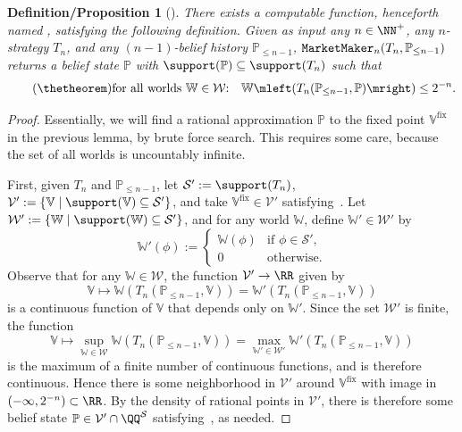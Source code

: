 \documentclass[authordate,onecolumn,noenvironments]{miri-tech-article}
\numberwithin{equation}{subsection}
\newtheorem{defprop}[theorem]{Definition/Proposition}
\newcommand{\nn}{n}
\newcommand{\trade}{T}%
\newcommand{\append}{,}
\newcommand{\adj}{{{\operatorname{fix}}}}
\newcommand{\Valuations}{\mathcal{V}}
\newcommand{\marketmaker}{\text{\upshape{\texttt{MarketMaker}}}\xspace}
\newcommand{\BelState}{\mathbb{P}}
\newcommand{\Valuation}{\mathbb{V}}
\newcommand{\pt}{\BelState}
\newcommand{\World}{\mathbb{W}}
\newcommand{\Worlds}{\mathcal{W}}
\newcommand{\Sentences}{\mathcal{S}}
\begin{document}
\begin{defprop}[\marketmaker]\label{def:markemaker}
  There exists a computable function, henceforth named \marketmaker, satisfying the following definition.  Given as input any $\nn\in\NN^+$, any $\nn$-strategy $\trade_\nn$, and any $(\nn-1)$-belief history $\pt_{\le \nn-1}$, $\marketmaker_\nn(\trade_\nn,\pt_{\le \nn-1})$ returns a belief state $\BelState$ with $\support(\BelState)\subseteq\support(\trade_\nn)$ such that
  \begin{equation}\tag{\thetheorem}\label{eq:marketmaker}
    \text{for all worlds $\World \in \Worlds$:}\quad\World\mleft(\trade_\nn(\pt_{\le \nn-1}\append\BelState)\mright) \le  2^{-n}.
  \end{equation}
\end{defprop}
\begin{proof}
 Essentially, we will find a rational approximation $\BelState$ to the fixed point $\Valuation^\adj$ in the previous lemma, by brute force search.  This requires some care, because the set of all worlds is uncountably infinite.

First, given $\trade_\nn$ and $\pt_{\le \nn-1}$, let $\Sentences':=\support(\trade_\nn)$, $\Valuations' := \{\Valuation \mid \support(\Valuation)\subseteq \Sentences'\}$, and take $\Valuation^\adj\in\Valuations'$ satisfying~.  Let 
$\Worlds' := \{\World \mid \support(\World)\subseteq\Sentences'\}$, and for any world $\World$, define $\World'\in\Worlds'$ by
\[
\World'(\phi) := 
\begin{cases}
\World(\phi) &\mbox{if $\phi\in\Sentences'$,}\\
0 &\mbox{otherwise.}
\end{cases}
\]
Observe that for any $\World\in\Worlds$, the function $\Valuations'\to\RR$ given by
\[\Valuation\mapsto\World
(\trade_\nn(\pt_{\le \nn-1},\Valuation)) = \World'
(\trade_\nn(\pt_{\le \nn-1},\Valuation))
\]
is a continuous function of $\Valuation$ that depends only on $\World'$.  Since the set $\Worlds'$ is finite, the function
\[
\Valuation\mapsto\sup_{\World\in\Worlds} \World
(\trade_\nn(\pt_{\le \nn-1}\append\Valuation)) = \max_{\World'\in\Worlds'} \World'
(\trade_\nn(\pt_{\le \nn-1}\append\Valuation))
\]
is the maximum of a finite number of continuous functions, and is therefore continuous.  Hence there is some neighborhood in $\Valuations'$ around $\Valuation^\adj$ with image in $(-\infty,2^{-n})
\subset \RR$. 
By the density of rational points in $\Valuations'$, there is therefore some belief state $\BelState\in\Valuations'\cap \QQ^{\Sentences}$ satisfying~, as needed.


\end{proof}
\end{document}
